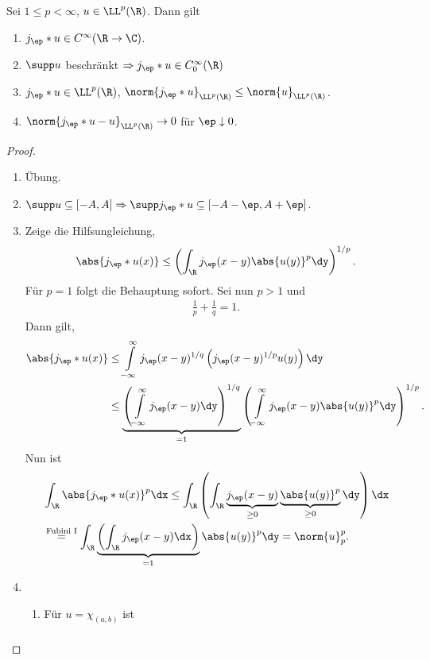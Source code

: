 \begin{prop}
\label{prop:2.22}
Sei $1\le p<\infty$, $u\in\LL^p(\R)$. Dann gilt
\begin{enumerate}[label=\arabic{*}.)]
  \item $j_\ep * u\in C^\infty(\R\to\C)$.
  \item $\supp u$ beschränkt $\Rightarrow j_\ep * u \in C_0^\infty(\R)$ 
  \item $j_\ep * u\in\LL^p(\R)$, $\norm{j_\ep*u}_{\LL^p(\R)}\le
  \norm{u}_{\LL^p(\R)}$.
  \item $\norm{j_\ep*u-u}_{\LL^p(\R)} \to 0$ für $\ep\downarrow 0$.\fishhere
\end{enumerate}
\end{prop}
\begin{proof}
\begin{enumerate}[label=\arabic{*}.)]
  \item Übung.
  \item $\supp u\subseteq [-A,A]\Rightarrow \supp j_\ep * u \subseteq [-A-\ep,
  A+\ep]$.
  \item Zeige die Hilfsungleichung,
\begin{align*}
\abs{j_\ep* u(x)} \le \left(\int_\R j_\ep(x-y) \abs{u(y)}^p \dy\right)^{1/p}.
\end{align*}
Für $p=1$ folgt die Behauptung sofort. Sei nun $p> 1$ und
\begin{align*}
\frac{1}{p}+\frac{1}{q} = 1.
\end{align*}
Dann gilt,
\begin{align*}
\abs{j_\ep*u(x)}
&\le \int\limits_{-\infty}^\infty j_\ep(x-y)^{1/q}\left(j_\ep(x-y)^{1/p}u(y)
\right)\dy\\
&\le \underbrace{\left(\int\limits_{-\infty}^\infty j_\ep(x-y)\dy\right)^{1/q}}_{=1}
\left(\int\limits_{-\infty}^\infty j_\ep(x-y) \abs{u(y)}^p\dy \right)^{1/p}.
\end{align*}
Nun ist
\begin{align*}
&\int_\R \abs{j_\ep*u(x)}^p \dx
\le \int_\R \left(\int_\R \underbrace{j_\ep(x-y)}_{\ge 0}
\underbrace{\abs{u(y)}^p}_{\ge 0} \dy\right)\dx\\
&\overset{\small\text{Fubini I}}{=}
\int_\R\underbrace{\left(\int_\R  j_\ep(x-y)\dx\right)}_{=1} \abs{u(y)}^p\dy
= \norm{u}_p^p.
\end{align*}
\item
\begin{enumerate}[label=\alph{*})]
\item Für $u=\chi_{(a,b)}$ ist
\begin{align*}

\end{align*}
\end{enumerate}
\end{enumerate}
\end{proof}
